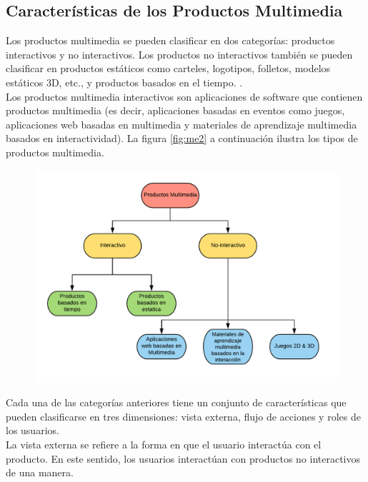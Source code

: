 \subsection{Características de los Productos Multimedia}
Los productos multimedia se pueden clasificar en dos categorías: productos interactivos y no interactivos. Los productos no interactivos también se pueden clasificar 
en productos estáticos  como carteles, logotipos, folletos, modelos estáticos 3D, etc., y productos basados en el tiempo. \cite{engels2002object,sauer2001uml}.\\
Los productos multimedia interactivos son aplicaciones de software que contienen productos multimedia\cite{miranda2017diseno} (es decir, aplicaciones basadas en eventos como juegos, 
aplicaciones web basadas en multimedia y materiales de aprendizaje multimedia basados en interactividad). La figura \ref{fig:me2} a continuación ilustra los tipos de 
productos multimedia.\\
\begin{figure}[H]
	\begin{center}
 		\includegraphics[width = 1\textwidth]{v2/images/image60.png}
	\end{center} 
\end{figure}
Cada una de las categorías anteriores tiene un conjunto de características que pueden  clasificarse en tres dimensiones: vista externa, flujo de acciones y roles de los usuarios.\\
La vista externa se refiere a la forma en que el usuario interactúa con el producto. En este sentido, los usuarios interactúan con productos no interactivos de una manera.\\
